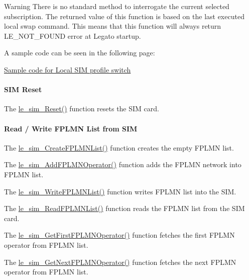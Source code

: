 \begin{DoxyWarning}{Warning}
There is no standard method to interrogate the current selected subscription. The returned value of this function is based on the last executed local swap command. This means that this function will always return L\+E\+\_\+\+N\+O\+T\+\_\+\+F\+O\+U\+ND error at Legato startup.
\end{DoxyWarning}
A sample code can be seen in the following page\+:
\begin{DoxyItemize}
\item \hyperlink{c_simTestProfileSwitch}{Sample code for Local S\+IM profile switch}
\end{DoxyItemize}\hypertarget{c_sim_le_sim_Reset}{}\paragraph{S\+I\+M Reset}\label{c_sim_le_sim_Reset}
The \hyperlink{le__sim__interface_8h_aaed2544651545d68845f3596fd5d448b}{le\+\_\+sim\+\_\+\+Reset()} function resets the S\+IM card.\hypertarget{c_sim_le_sim_FPLMNList}{}\paragraph{Read / Write F\+P\+L\+M\+N List from S\+IM}\label{c_sim_le_sim_FPLMNList}
The \hyperlink{le__sim__interface_8h_ac9657cb9b3af960910988ce23c8fc31a}{le\+\_\+sim\+\_\+\+Create\+F\+P\+L\+M\+N\+List()} function creates the empty F\+P\+L\+MN list.

The \hyperlink{le__sim__interface_8h_a9c425b48c314ce4ec85bc2954aedf238}{le\+\_\+sim\+\_\+\+Add\+F\+P\+L\+M\+N\+Operator()} function adds the F\+P\+L\+MN network into F\+P\+L\+MN list.

The \hyperlink{le__sim__interface_8h_aa0eaa48a1c29cd8f3d64e866823ca2ca}{le\+\_\+sim\+\_\+\+Write\+F\+P\+L\+M\+N\+List()} function writes F\+P\+L\+MN list into the S\+IM.

The \hyperlink{le__sim__interface_8h_a09ab2e629232e35ffbc0007dca0923e9}{le\+\_\+sim\+\_\+\+Read\+F\+P\+L\+M\+N\+List()} function reads the F\+P\+L\+MN list from the S\+IM card.

The \hyperlink{le__sim__interface_8h_acdc45e95cbcbff57f3dd0dc6e1967d39}{le\+\_\+sim\+\_\+\+Get\+First\+F\+P\+L\+M\+N\+Operator()} function fetches the first F\+P\+L\+MN operator from F\+P\+L\+MN list.

The \hyperlink{le__sim__interface_8h_af7069f351aca77efe7dcfe1519df21c8}{le\+\_\+sim\+\_\+\+Get\+Next\+F\+P\+L\+M\+N\+Operator()} function fetches the next F\+P\+L\+MN operator from F\+P\+L\+MN list.

